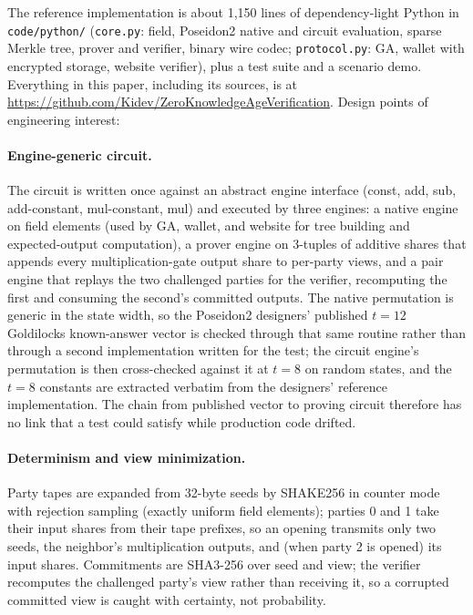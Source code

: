 \documentclass[11pt]{article}
\theoremstyle{definition}
\begin{document}
The reference implementation is about 1{,}150 lines of dependency-light Python in
\texttt{code/python/} (\texttt{core.py}: field, Poseidon2 native and circuit evaluation,
sparse Merkle tree, prover and verifier, binary wire codec; \texttt{protocol.py}: GA,
wallet with encrypted storage, website verifier), plus a test suite and a scenario demo.
Everything in this paper, including its sources, is at
\url{https://github.com/Kidev/ZeroKnowledgeAgeVerification}. Design points of engineering
interest:

\paragraph{Engine-generic circuit.} The circuit is written once against an abstract engine
interface (const, add, sub, add-constant, mul-constant, mul) and executed by three
engines: a native engine on field elements (used by GA, wallet, and website for tree
building and expected-output computation), a prover engine on 3-tuples of additive shares
that appends every multiplication-gate output share to per-party views, and a pair engine
that replays the two challenged parties for the verifier, recomputing the first and
consuming the second's committed outputs. The native permutation is generic in the state
width, so the Poseidon2 designers' published $t = 12$ Goldilocks known-answer vector is
checked through that same routine rather than through a second implementation written for
the test; the circuit engine's permutation is then cross-checked against it at $t = 8$ on
random states, and the $t = 8$ constants are extracted verbatim from the designers'
reference implementation. The chain from published vector to proving circuit therefore has
no link that a test could satisfy while production code drifted.

\paragraph{Determinism and view minimization.} Party tapes are expanded from 32-byte seeds
by SHAKE256 in counter mode with rejection sampling (exactly uniform field elements);
parties 0 and 1 take their input shares from their tape prefixes, so an opening transmits
only two seeds, the neighbor's multiplication outputs, and (when party 2 is opened) its
input shares. Commitments are SHA3-256 over seed and view; the verifier recomputes the
challenged party's view rather than receiving it, so a corrupted committed view is caught
with certainty, not probability.
\end{document}
